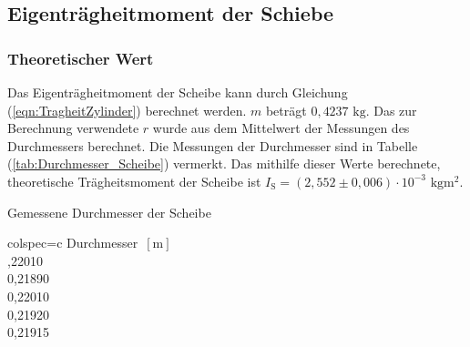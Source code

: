   \subsection{Eigenträgheitmoment der Schiebe}
    \subsubsection{Theoretischer Wert}
    Das Eigenträgheitmoment der Scheibe kann durch Gleichung (\ref{eqn:TragheitZylinder}) berechnet werden. $m$ beträgt $0,4237 \,\,\unit{\kilo\gram}$.
    Das zur Berechnung verwendete $r$ wurde aus dem Mittelwert der Messungen des Durchmessers berechnet. 
    Die Messungen der Durchmesser sind in Tabelle (\ref{tab:Durchmesser_Scheibe}) vermerkt. Das mithilfe dieser Werte berechnete, theoretische 
    Trägheitsmoment der Scheibe ist $I_{\text{S}} = (2,552 \pm 0,006) \cdot 10^{-3} \,\,\unit{\kilo\gram\meter\squared}$. 
    \begin{table}[H]
      \centering 
      \caption{Gemessene Durchmesser der Scheibe}
      \label{tab:Durchmesser_Scheibe}
      \begin{tblr}{colspec={c}}
          \toprule
          Durchmesser $\,[\unit{\meter}]$ \\
          ,22010 \\
          0,21890 \\
          0,22010 \\
          0,21920 \\
          0,21915 \\
          \bottomrule
      \end{tblr}
    \end{table}

